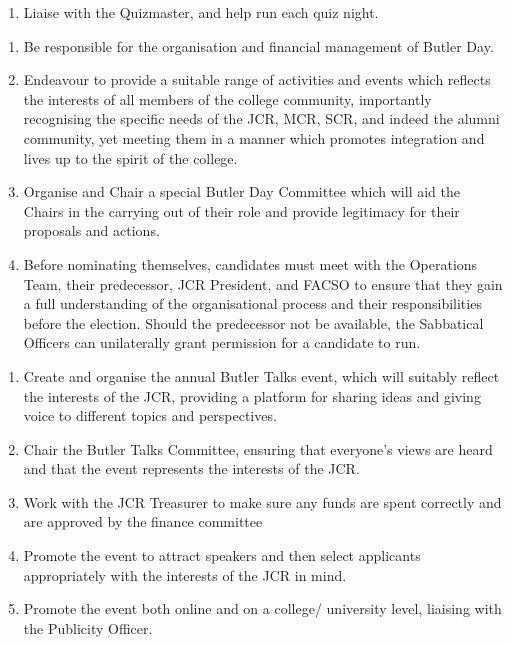 \begin{enumerate}
    \item Liaise with the Quizmaster, and help run each quiz night.
    
\end{enumerate}

\begin{enumerate}
    \item Be responsible for the organisation and financial management of Butler Day.
    \item Endeavour to provide a suitable range of activities and events which reflects the interests of all members of the college community, importantly recognising the specific needs of the JCR, MCR, SCR, and indeed the alumni community, yet meeting them in a manner which promotes integration and lives up to the spirit of the college.
    \item Organise and Chair a special Butler Day Committee which will aid the Chairs in the carrying out of their role and provide legitimacy for their proposals and actions.
    \item Before nominating themselves, candidates must meet with the Operations Team, their predecessor, JCR President, and FACSO to ensure that they gain a full understanding of the organisational process and their responsibilities before the election. Should the predecessor not be available, the Sabbatical Officers can unilaterally grant permission for a candidate to run. 
    
\end{enumerate}

\begin{enumerate}
    \item Create and organise the annual Butler Talks event, which will suitably reflect the interests of the JCR, providing a platform for sharing ideas and giving voice to different topics and perspectives.
    \item Chair the Butler Talks Committee, ensuring that everyone’s views are heard and that the event represents the interests of the JCR.
    \item Work with the JCR Treasurer to make sure any funds are spent correctly and are approved by the finance committee   \item Promote the event to attract speakers and then select applicants appropriately with the interests of the JCR in mind.
    \item Promote the event both online and on a college/ university level, liaising with the Publicity Officer.
    
\end{enumerate}

